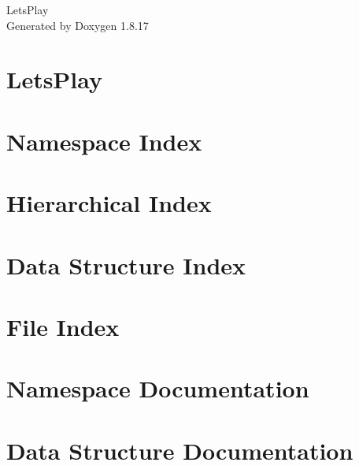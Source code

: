\let\mypdfximage\pdfximage\def\pdfximage{\immediate\mypdfximage}\documentclass[twoside]{book}
\newcommand{\+}{\discretionary{\mbox{\scriptsize$\hookleftarrow$}}{}{}}
\newcommand{\clearemptydoublepage}{%
  \newpage{\pagestyle{empty}\cleardoublepage}%
}
\begin{document}
\hypersetup{pageanchor=false,
             bookmarksnumbered=true,
             pdfencoding=unicode
            }
\begin{titlepage}
\vspace*{7cm}
\begin{center}%
{\Large Lets\+Play }\\
\vspace*{1cm}
{\large Generated by Doxygen 1.8.17}\\
\end{center}
\end{titlepage}
\clearemptydoublepage
{}
\tableofcontents
\clearemptydoublepage
{}
\hypersetup{pageanchor=true}

\chapter{Lets\+Play}
\label{md_README}

\chapter{Namespace Index}

\chapter{Hierarchical Index}

\chapter{Data Structure Index}

\chapter{File Index}

\chapter{Namespace Documentation}

\chapter{Data Structure Documentation}


































\end{document}

